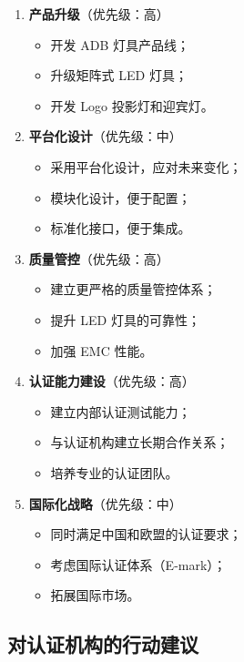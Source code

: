 \begin{enumerate}[leftmargin=2em]
    \item \textbf{产品升级}（优先级：高）
    \begin{itemize}[leftmargin=2em]
        \item 开发 ADB 灯具产品线；
        \item 升级矩阵式 LED 灯具；
        \item 开发 Logo 投影灯和迎宾灯。
    \end{itemize}

    \item \textbf{平台化设计}（优先级：中）
    \begin{itemize}[leftmargin=2em]
        \item 采用平台化设计，应对未来变化；
        \item 模块化设计，便于配置；
        \item 标准化接口，便于集成。
    \end{itemize}

    \item \textbf{质量管控}（优先级：高）
    \begin{itemize}[leftmargin=2em]
        \item 建立更严格的质量管控体系；
        \item 提升 LED 灯具的可靠性；
        \item 加强 EMC 性能。
    \end{itemize}

    \item \textbf{认证能力建设}（优先级：高）
    \begin{itemize}[leftmargin=2em]
        \item 建立内部认证测试能力；
        \item 与认证机构建立长期合作关系；
        \item 培养专业的认证团队。
    \end{itemize}

    \item \textbf{国际化战略}（优先级：中）
    \begin{itemize}[leftmargin=2em]
        \item 同时满足中国和欧盟的认证要求；
        \item 考虑国际认证体系（E-mark）；
        \item 拓展国际市场。
    \end{itemize}
\end{enumerate}

\subsection{对认证机构的行动建议}

